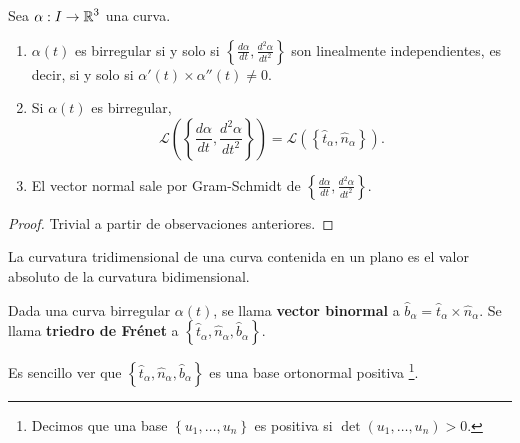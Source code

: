 \begin{colorary}
	Sea $\displaystyle \alpha : I \to \mathbb{R}^{3} $ una curva. 
\begin{enumerate}
	\item $\displaystyle \alpha\left(t\right) $ es birregular si y solo si $\displaystyle \left\{ \frac{d\alpha }{dt}, \frac{d^{2}\alpha }{dt ^{2}}\right\}  $ son linealmente independientes, es decir, si y solo si $\displaystyle \alpha'\left(t\right)\times\alpha''\left(t\right)\neq 0 $.
	\item Si $\displaystyle \alpha\left(t\right) $ es birregular, 
		\[\mathcal{L}\left(\left\{\frac{d\alpha }{d t}, \frac{d^{2}\alpha }{dt ^{2}}\right\}\right)=\mathcal{L}\left(\left\{\hat{t}_{\alpha }, \hat{n}_{\alpha }\right\}\right) .\]
	\item El vector normal sale por Gram-Schmidt de $\displaystyle \left\{ \frac{d\alpha }{dt}, \frac{d^{2}\alpha }{dt ^{2}}\right\}  $. 
\end{enumerate}
\end{colorary}
\begin{proof}
Trivial a partir de observaciones anteriores.
\end{proof}

\begin{observation}
La curvatura tridimensional de una curva contenida en un plano es el valor absoluto de la curvatura bidimensional.
\end{observation}
\begin{definition}
	Dada una curva birregular $\displaystyle \alpha\left(t\right) $, se llama \textbf{vector binormal} a $\displaystyle \hat{b}_{\alpha }=\hat{t}_{\alpha } \times \hat{n}_{\alpha } $. Se llama \textbf{triedro de Frénet} a $\displaystyle \left\{ \hat{t}_{\alpha }, \hat{n}_{\alpha }, \hat{b}_{\alpha }\right\}  $. 
\end{definition}
\begin{observation}
	Es sencillo ver que $\displaystyle \left\{ \hat{t}_{\alpha }, \hat{n}_{\alpha }, \hat{b}_{\alpha }\right\}  $ es una base ortonormal positiva \footnote{Decimos que una base $\displaystyle \left\{ u_{1}, \ldots, u_{n}\right\}  $ es positiva si $\displaystyle \det\left(u_{1}, \ldots, u_{n}\right)>0 $.}. 
\end{observation}

